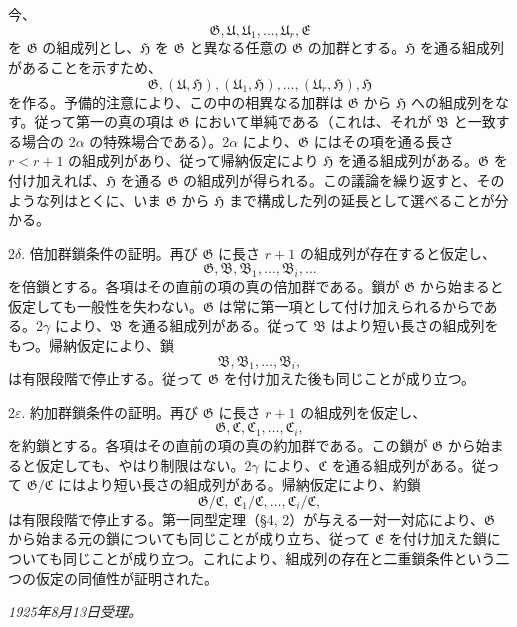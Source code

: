 \documentclass[11pt]{article}
\providecommand{\mB}{\mathfrak{B}}
\providecommand{\mC}{\mathfrak{C}}
\providecommand{\mE}{\mathfrak{E}}
\providecommand{\mG}{\mathfrak{G}}
\providecommand{\mH}{\mathfrak{H}}
\providecommand{\mU}{\mathfrak{U}}
\begin{document}
今、
\[
        \mG,\mU,\mU_1,\ldots,\mU_r,\mE
\]
を $\mG$ の組成列とし、$\mH$ を $\mG$ と異なる任意の $\mG$ の加群とする。$\mH$ を通る組成列があることを示すため、
\[
        \mG,(\mU,\mH),(\mU_1,\mH),\ldots,(\mU_r,\mH),\mH
\]
を作る。予備的注意により、この中の相異なる加群は $\mG$ から $\mH$ への組成列をなす。従って第一の真の項は $\mG$ において単純である（これは、それが $\mB$ と一致する場合の 2$\alpha$ の特殊場合である）。2$\alpha$ により、$\mG$ にはその項を通る長さ $r<r+1$ の組成列があり、従って帰納仮定により $\mH$ を通る組成列がある。$\mG$ を付け加えれば、$\mH$ を通る $\mG$ の組成列が得られる。この議論を繰り返すと、そのような列はとくに、いま $\mG$ から $\mH$ まで構成した列の延長として選べることが分かる。

2$\delta$. 倍加群鎖条件の証明。再び $\mG$ に長さ $r+1$ の組成列が存在すると仮定し、
\[
        \mG,\mB,\mB_1,\ldots,\mB_i,\ldots
\]
を倍鎖とする。各項はその直前の項の真の倍加群である。鎖が $\mG$ から始まると仮定しても一般性を失わない。$\mG$ は常に第一項として付け加えられるからである。2$\gamma$ により、$\mB$ を通る組成列がある。従って $\mB$ はより短い長さの組成列をもつ。帰納仮定により、鎖
\[
        \mB,\mB_1,\ldots,\mB_i,
\]
は有限段階で停止する。従って $\mG$ を付け加えた後も同じことが成り立つ。

2$\varepsilon$. 約加群鎖条件の証明。再び $\mG$ に長さ $r+1$ の組成列を仮定し、
\[
        \mG,\mC,\mC_1,\ldots,\mC_i,
\]
を約鎖とする。各項はその直前の項の真の約加群である。この鎖が $\mG$ から始まると仮定しても、やはり制限はない。2$\gamma$ により、$\mC$ を通る組成列がある。従って $\mG/\mC$ にはより短い長さの組成列がある。帰納仮定により、約鎖
\[
        \mG/\mC,\ \mC_1/\mC,\ldots,\mC_i/\mC,
\]
は有限段階で停止する。第一同型定理（§4, 2）が与える一対一対応により、$\mG$ から始まる元の鎖についても同じことが成り立ち、従って $\mE$ を付け加えた鎖についても同じことが成り立つ。これにより、組成列の存在と二重鎖条件という二つの仮定の同値性が証明された。

\emph{1925年8月13日受理。}
\end{document}
